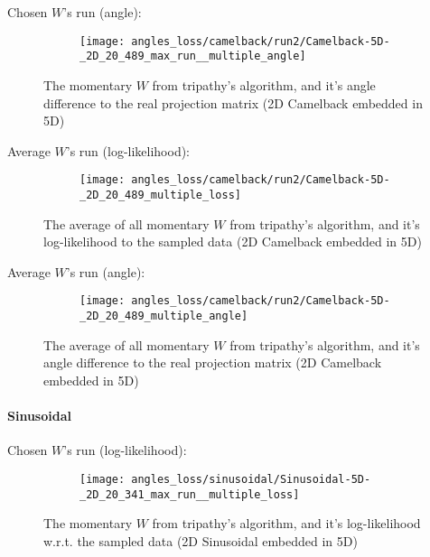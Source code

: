 Chosen $W$'s run (angle):
\begin{figure}[H]
    \begin{subfigure}[b]{0.40\textwidth}
        \texttt{[image: angles\_loss/camelback/run2/Camelback-5D-\_2D\_20\_489\_max\_run\_\_multiple\_angle]}
        \label{fig:tiger}
    \end{subfigure}   
           \caption{The momentary $W$ from tripathy's algorithm, and it's angle difference to the real projection matrix (2D Camelback embedded in 5D)}
\end{figure}

Average $W$'s run (log-likelihood):
\begin{figure}[H]
    \centering
    \begin{subfigure}[b]{0.40\textwidth}
        \texttt{[image: angles\_loss/camelback/run2/Camelback-5D-\_2D\_20\_489\_multiple\_loss]}
        \label{fig:tiger}
    \end{subfigure}   
           \caption{The average of all momentary $W$ from tripathy's algorithm, and it's log-likelihood to the sampled data (2D Camelback embedded in 5D)}
\end{figure}

Average $W$'s run (angle):
\begin{figure}[H]
    \centering
    \begin{subfigure}[b]{0.40\textwidth}
        \texttt{[image: angles\_loss/camelback/run2/Camelback-5D-\_2D\_20\_489\_multiple\_angle]}
        \label{fig:tiger}
    \end{subfigure}   
           \caption{The average of all momentary $W$ from tripathy's algorithm, and it's angle difference to the real projection matrix (2D Camelback embedded in 5D)}
\end{figure}


\paragraph{Sinusoidal}
Chosen $W$'s run (log-likelihood):

\begin{figure}[H]
    \centering
    \begin{subfigure}[b]{0.40\textwidth}
        \texttt{[image: angles\_loss/sinusoidal/Sinusoidal-5D-\_2D\_20\_341\_max\_run\_\_multiple\_loss]}
        \label{fig:gull}
    \end{subfigure}
           \caption{The momentary $W$ from tripathy's algorithm, and it's log-likelihood w.r.t. the sampled data (2D Sinusoidal embedded in 5D)}
\end{figure}

